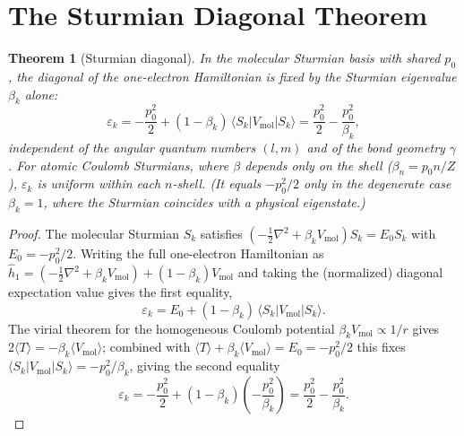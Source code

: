 \documentclass[aps,pra,twocolumn,superscriptaddress,longbibliography]{revtex4-2}
\newtheorem{theorem}{Theorem}
\theoremstyle{remark}
\theoremstyle{plain}
\begin{document}
\section{The Sturmian Diagonal Theorem}
\label{sec:uniform}

\begin{theorem}[Sturmian diagonal]
\label{thm:uniform}
In the molecular Sturmian basis with shared $p_0$, the diagonal of the
one-electron Hamiltonian is fixed by the Sturmian eigenvalue $\beta_k$
alone:
\begin{equation}
\varepsilon_k = -\frac{p_0^2}{2}
+ (1-\beta_k)\,\langle S_k | V_{\mathrm{mol}} | S_k \rangle
= \frac{p_0^2}{2} - \frac{p_0^2}{\beta_k},
\label{eq:uniform_diag}
\end{equation}
independent of the angular quantum numbers $(l,m)$ and of the bond geometry
$\gamma$.  For atomic Coulomb Sturmians, where $\beta$ depends only on the
shell ($\beta_n = p_0 n/Z$), $\varepsilon_k$ is uniform within each
$n$-shell.  (It equals $-p_0^2/2$ only in the degenerate case $\beta_k=1$,
where the Sturmian coincides with a physical eigenstate.)
\end{theorem}

\begin{proof}
The molecular Sturmian $S_k$ satisfies
$(-\frac{1}{2}\nabla^2 + \beta_k V_{\mathrm{mol}}) S_k = E_0 S_k$
with $E_0 = -p_0^2/2$.  Writing the full one-electron Hamiltonian as
$\hat{h}_1 = (-\frac{1}{2}\nabla^2 + \beta_k V_{\mathrm{mol}})
+ (1-\beta_k)V_{\mathrm{mol}}$ and taking the (normalized) diagonal
expectation value gives the first equality,
\begin{equation}
\varepsilon_k = E_0 + (1 - \beta_k)\,
\langle S_k | V_{\mathrm{mol}} | S_k \rangle.
\end{equation}
The virial theorem for the homogeneous Coulomb potential
$\beta_k V_{\mathrm{mol}} \propto 1/r$ gives
$2\langle T\rangle = -\beta_k\langle V_{\mathrm{mol}}\rangle$; combined with
$\langle T\rangle + \beta_k\langle V_{\mathrm{mol}}\rangle = E_0 = -p_0^2/2$
this fixes
$\langle S_k | V_{\mathrm{mol}} | S_k \rangle = -p_0^2/\beta_k$, giving the
second equality
\begin{equation}
\varepsilon_k = -\frac{p_0^2}{2} + (1-\beta_k)\!\left(-\frac{p_0^2}{\beta_k}\right)
= \frac{p_0^2}{2} - \frac{p_0^2}{\beta_k}.
\end{equation}
\end{proof}
\end{document}
